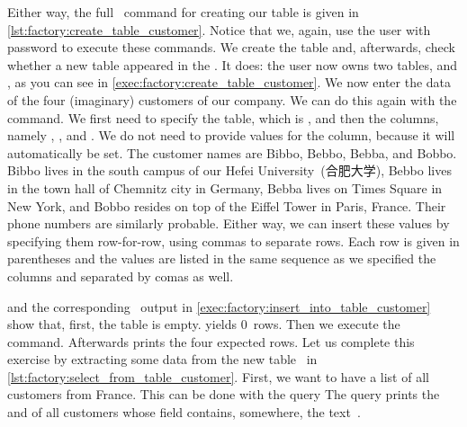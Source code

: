 Either way, the full \sql\ command for creating our table  is given in \cref{lst:factory:create_table_customer}.
Notice that we, again, use the  user with password  to execute these commands.
We create the table and, afterwards, check whether a new table appeared in the .
It does: the user  now owns two tables,  and , as you can see in \cref{exec:factory:create_table_customer}.%
%
\endhsection%
%
%
%
%
We now enter the data of the four (imaginary) customers of our company.
We can do this again with the  command.
We first need to specify the table, which is , and then the columns, namely , , and .
We do not need to provide values for the  column, because it will automatically be set.
The customer names are Bibbo, Bebbo, Bebba, and Bobbo.
Bibbo lives in the south campus of our Hefei University~(合肥大学), Bebbo lives in the town hall of Chemnitz city in Germany, Bebba lives on Times Square in New York, and Bobbo resides on top of the Eiffel Tower in Paris, France.
Their phone numbers are similarly probable.
Either way, we can insert these values by specifying them row-for-row, using commas to separate rows.
Each row is given in parentheses and the values are listed in the same sequence as we specified the columns and separated by comas as well.

 and the corresponding \psql\ output in \cref{exec:factory:insert_into_table_customer} show that, first, the table is empty.
 yields 0~rows.
Then we execute the  command.
Afterwards  prints the four expected rows.%
\endhsection%
%
%
%
%
Let us complete this exercise by extracting some data from the new table~ in \cref{lst:factory:select_from_table_customer}.
First, we want to have a list of all customers from France.
This can be done with the query 
The query prints the  and  of all customers whose  field contains, somewhere, the text~.

